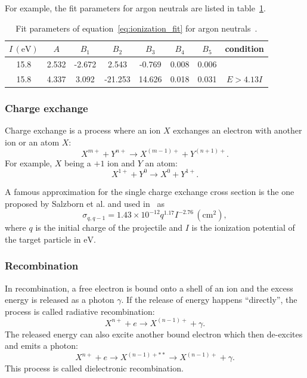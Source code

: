 \documentclass[a4paper,twoside,12pt]{article}
\begin{document}
For example, the fit parameters for argon neutrals are listed in table~\ref{table:argon_ionization}.
\begin{table}
    \centering
    \caption{Fit parameters of equation~\ref{eq:ionization_fit} for argon neutrals~\cite{recommended_ionization}.}
    \label{table:argon_ionization}
    \begin{tabular}{cccccccc}
        \toprule
        $I\,(\si{\electronvolt})$ & $A$ & $B_1$ & $B_2$ & $B_3$ & $B_4$ & $B_5$ & condition\\
        \midrule
        15.8 & 2.532 & -2.672 & 2.543 & -0.769 & 0.008 & 0.006 & \\
        15.8 & 4.337 & 3.092 & -21.253 & 14.626 & 0.018 & 0.031 & $E > 4.13I$ \\
        \bottomrule
    \end{tabular}
\end{table}

\subsubsection{Charge exchange}
Charge exchange is a process where an ion $X$ exchanges an electron with another ion or an atom $X$:
\[
    X^{m+} + Y^{n+} \rightarrow X^{(m-1)+} + Y^{(n+1)+}.
\]
For example, $X$ being a $+1$ ion and $Y$ an atom:
\[
    X^{1+} + Y^0 \rightarrow X^{0} + Y^{1+}.
\]

A famous approximation for the single charge exchange cross section is the one proposed by Salzborn et al. and used in~\cite{cex} as
\begin{equation}
    \label{eq:cex}
    \sigma_{q, q-1} = 1.43 \times 10^{-12} q^{1.17} I^{-2.76}\,(\si{\centi\metre\squared}),
\end{equation}
where $q$ is the initial charge of the projectile and $I$ is the ionization potential of the target particle in $\si{\electronvolt}$.

\subsubsection{Recombination}
In recombination, a free electron is bound onto a shell of an ion and the excess energy is released as a photon $\gamma$. If the release of energy happens ``directly'', the process is called radiative recombination:
\[
    X^{n+} + e \rightarrow X^{(n-1)+} + \gamma.
\]
The released energy can also excite another bound electron which then de-excites and emits a photon:
\[
    X^{n+} + e \rightarrow X^{(n-1)+**} \rightarrow X^{(n-1)+} + \gamma.
\]
This process is called dielectronic recombination.~\cite{nist:recombination}
\end{document}
